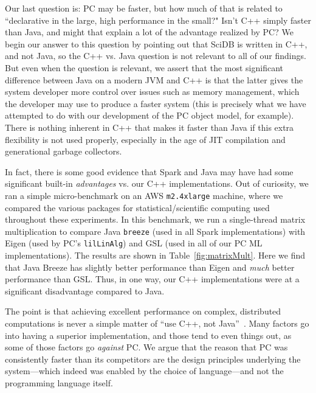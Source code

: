 Our last question is: PC may be faster, but how much of that is related to ``declarative in the large, high performance in 
the small?"   Isn't C++ simply faster than Java, and might that explain a lot of the advantage realized by PC?  We begin
our answer to this question by pointing out that SciDB is written in C++, and not Java, so the C++ vs. Java question is not 
relevant to all of our findings.
But even when the question is relevant, we assert that the most significant
difference between Java on a modern JVM and C++ is that the latter
gives the system developer more control over issues such as memory management, 
which the developer may use to produce a faster system (this is precisely
what we have attempted to do with our development of the PC object model, for example).  
There is nothing inherent in C++ that makes it faster than Java if this extra flexibility is not used properly, 
especially in the age of
JIT compilation and generational garbage collectors.  

In fact, there is some good evidence that Spark and Java may have had some significant
built-in \emph{advantages} vs. our C++ implementations.
Out of curiosity, we ran a simple micro-benchmark on an AWS \texttt{m2.4xlarge} machine, where we compared the various
packages for statistical/scientific computing used throughout these experiments.
In this benchmark, we run a single-thread matrix multiplication
to compare Java \texttt{breeze} (used in all Spark implementations) 
with Eigen (used by PC's \texttt{lilLinAlg}) and GSL (used in all of our PC ML implementations).
The results are shown in Table~\ref{fig:matrixMult}.  
Here we find that Java Breeze has slightly better performance than Eigen and \emph{much}
better performance than GSL.  
Thus, in one way, our C++ implementations were at a significant disadvantage compared to Java.

The point is that achieving excellent performance on complex, distributed computations is never a simple matter
of ``use C++, not Java''~\cite{ousterhout2015making, shi2015clash}.  Many factors go into having a superior implementation, and those tend to even things out,
as some of those factors 
go \emph{against} PC.  We argue that the reason that PC was consistently faster
than its competitors are the design principles underlying the system---which indeed was enabled by the choice of language---and 
not the programming language itself.

